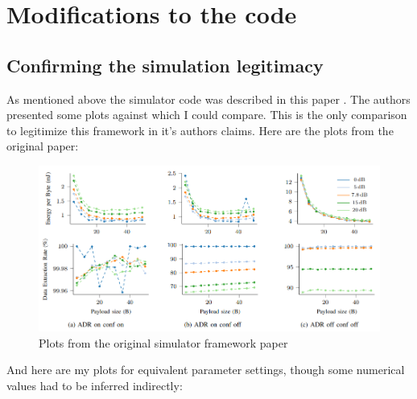 

\chapter{Modifications to the code}

\section{Confirming the simulation legitimacy}
As mentioned above the simulator code was described in this 
paper \cite{simulator}. The authors presented some plots against
which I could compare. This is the only comparison to legitimize
this framework in it's authors claims. Here are the plots from
the original paper:

\begin{figure}[H]
\centering
\includegraphics[scale=0.6]{figures/original_plots.PNG}
  \caption{Plots from the original simulator framework paper \cite{simulator}}
  \label{fig:my_sectors}
\end{figure}

And here are my plots for equivalent parameter settings, though
some numerical values had to be inferred indirectly:

